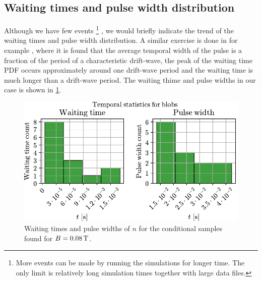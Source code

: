 \subsection{Waiting times and pulse width distribution}
%
Although we have few events
%
\footnote{
    More events can be made by running the simulations for longer time.
    The only limit is relatively long simulation times together with large data files.
}
%
, we would briefly indicate the trend of the waiting times and pulse width distribution.
A similar exercise is done in for example \cite{Hornung2011}, where it is found that the average temporal width of the pulse is a fraction of the period of a characteristic drift-wave, the peak of the waiting time PDF occurs approximately around one drift-wave period and the waiting time is much longer than a drift-wave period.
The waiting thime and pulse widths in our case is shown in \cref{fig:tempStatBlob}.
%
\begin{figure}[h!]
    \begin{center}
        \includegraphics{fig/results/blobs/temporalStats-blobsB0_008}
    \end{center}
    \caption{
        Waiting times and pulse widths of $n$ for the conditional samples found for $B=0.08\, \text{T}$.
    }
    \label{fig:tempStatBlob}
\end{figure}
